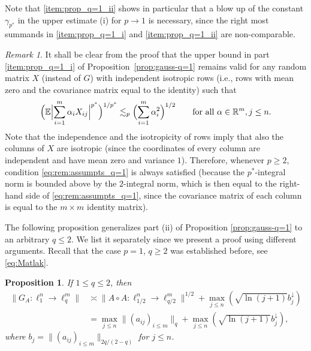 \documentclass[a4paper]{amsart}
\newtheorem{proposition}[theorem]{Proposition} %
\theoremstyle{definition}
\theoremstyle{remark}
\newtheorem{remark}[theorem]{Remark}
\numberwithin{equation}{section}
\newcommand*{\RR}{\mathbb{R}}
\newcommand*{\EE}{\mathbb{E}}
\newcommand*{\hadprod}{\mathbin{\circ}} %
\newcommand*{\rearr}{\downarrow} %
\begin{document}
Note that \ref{item:prop_q=1_ii} shows in particular that a blow up of the constant $\gamma_{p^\ast}$ in the upper estimate (i) for $p\to 1$  is necessary, since the right most summands   in   \ref{item:prop_q=1_i} and \ref{item:prop_q=1_ii} are non-comparable.

\begin{remark}	\label{rem:assumpts_q=1}
	It shall be clear from the proof that the upper bound in part \ref{item:prop_q=1_i} of Proposition~\ref{prop:gauss-q=1} remains valid for any random matrix $X$ (instead of $G$) with independent  isotropic rows (i.e., rows with mean zero and the covariance matrix equal to the identity) such that
	\begin{equation}	\label{eq:rem:assumpts_q=1}
	\Bigr(  \EE \Bigl|\sum_{i=1}^m \alpha_{i}X_{ij}\Bigr|^{p^*}\Bigr)^{1/p^*}
	\lesssim_p \Bigl(\sum_{i=1}^m \alpha_{i}^2\Bigr)^{1/2} \qquad \text{for all } \alpha \in \RR^m, j\le n.
	\end{equation}
	 Note that the independence and the isotropicity of rows 
	 imply that also the columns of $X$ are isotropic (since the coordinates of every column are independent and have mean zero and  variance $1$). Therefore,  whenever $p\geq 2$, condition \eqref{eq:rem:assumpts_q=1} is always satisfied (because the $p^\ast$-integral norm is bounded above by the $2$-integral norm, which is then equal to the right-hand side of \eqref{eq:rem:assumpts_q=1}, since the covariance matrix of each column is equal to the $m\times m$ identity matrix).
	\end{remark}


The following proposition generalizes part (ii) of Proposition \ref{prop:gauss-q=1} to an arbitrary $q \le   2$. We list it separately since we present a proof using different arguments. Recall that the case $p=1$, $q\ge 2$ was established before, see \eqref{eq:Matlak}.

\begin{proposition}\label{prop:gauss-p=1-q<2}
If $1\leq q \leq 2$, then
\begin{align*}
  \|G_A\colon \ell_1^n \to \ell_q^m\|
  &\asymp \|A\hadprod A\colon \ell_{1/2}^n \to \ell_{q/2}^m\|^{1/2} + \max_{j\le n} (\sqrt{\ln(j+1)} b_j^{\rearr{}})\\
  & = \max_{j\le n} \|(a_{ij})_{i\le m}\|_q + \max_{j\le n} (\sqrt{\ln(j+1)} b_j^{\rearr{}}),
\end{align*}
where $b_j = \|(a_{ij})_{i\le m}\|_{2q/(2-q)}$ for $j\leq n$. 
\end{proposition}
\end{document}
